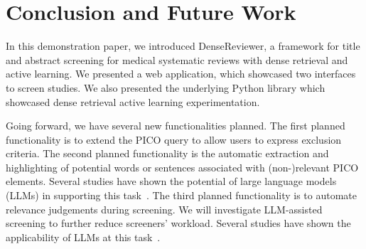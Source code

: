 \section{Conclusion and Future Work}
\label{future}
\sloppy
In this demonstration paper, we introduced DenseReviewer, a framework for title and abstract screening for medical systematic reviews with dense retrieval and active learning. We presented a web application, which showcased two interfaces to screen studies. We also presented the underlying Python library which showcased dense retrieval active learning experimentation.

Going forward, we have several new functionalities planned. 
The first planned functionality is to extend the PICO query to allow users to express exclusion criteria. 
The second planned functionality is the automatic extraction and highlighting of potential words or sentences associated with (non-)relevant PICO elements. Several studies have shown the potential of large language models (LLMs) in supporting this task~\cite{ghosh2024alpapico,reason2024automated}. 
The third planned functionality is to automate relevance judgements during screening. We will investigate LLM-assisted screening to further reduce screeners' workload. Several studies have shown the applicability of LLMs at this task~\cite{cao2024prompting,bron2024combining,scherbakov2024emergence}.

